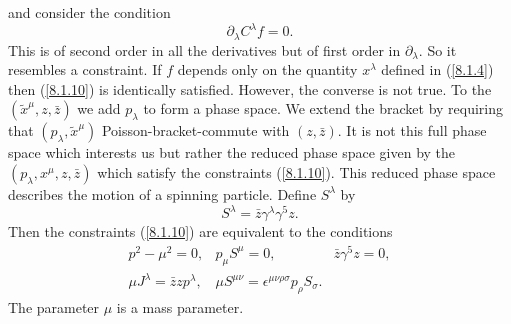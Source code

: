 \documentclass[a4paper,12pt]{article}
\def\p{\partial}
\def\t#1{\tilde #1}
\def\t#1{\tilde #1}
\begin{document}
and consider the condition
\begin{equation}
\p_{\lambda} C^{\lambda} f = 0.                        \label{8.1.10}
\end{equation}
This is of second order in all the derivatives but of first order in
$\p_{\lambda}$. So it resembles a constraint. If $f$ depends
only on the quantity $x^{\lambda}$ defined in (\ref{8.1.4}) then
(\ref{8.1.10}) is identically satisfied. However, the converse is not
true. To the $(\t{x}^{\mu}, z, \bar z)$ we add $p_{\lambda}$ to form a phase
space. We extend the bracket by requiring that
$(p_{\lambda}, \t{x}^{\mu})$ Poisson-bracket-commute with $(z, \bar z)$. It
is not this full phase space which interests us but rather the reduced
phase space given by the $(p_{\lambda}, x^{\mu}, z, \bar z)$ which
satisfy the constraints (\ref{8.1.10}). This reduced phase space
describes the motion of a spinning particle. Define $S^{\lambda}$ by
$$
S^{\lambda} = \bar z \gamma^{\lambda} \gamma^5 z.           %
$$
Then the constraints (\ref{8.1.10}) are equivalent to the conditions
$$
\begin{array}{lll}
p^2 - \mu^2 = 0, &p_{\mu} S^{\mu} = 0, &\bar z \gamma^5 z = 0, \\[4pt]
\mu J^{\lambda} = \bar z z p^{\lambda},
&\mu S^{\mu\nu} = \epsilon^{\mu\nu\rho\sigma} p_{\rho} S_{\sigma}.
\end{array}
$$
The parameter $\mu$ is a mass parameter. 
\end{document}
